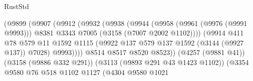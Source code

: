 \begin{lexlean}{RustStd}
\begin{coremodule}
{\begin{coremodule}
{{{{{{{{{{{{{{{{{{{{{{{{{{                                            (@9899
                                              (@9907
                                                (@9912
                                                  (@9932
                                                    (@9938
                                                      (@9944
                                                        (@9958
                                                          (@9961 (@9976 (@9991 @9993)))
                                                          @8381
                                                          @3343
                                                          @7005
                                                          (@3158 (@7007 @2002 @1102))))
                                                      (@9914
                                                        @411
                                                        @78
                                                        @579
                                                        @11
                                                        @1592
                                                        @1115
                                                        (@9922
                                                          @137
                                                          @579
                                                          @137
                                                          @1592
                                                          (@3144 (@9927 @137))
                                                          @7028)
                                                        @9993))))
                                                @8514
                                                @8517
                                                @8520
                                                @8523))
                                            (@4257 (@9881 @41))
                                            (@3158 (@9886 @332 @291))
                                            (@3113 (@9893 @291 @43 @1423 @1102))
                                            (@3354
                                              @9580
                                              @76
                                              @518
                                              @1102
                                              @1127
                                              (@4304
                                                @9580
                                                @1021
}}}}}}}}}}}}}}}}}}}}}}}}}}
\end{coremodule}}
\end{coremodule}
\end{lexlean}
